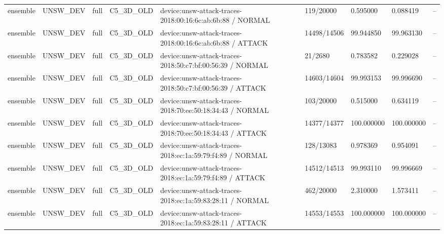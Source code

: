 \begin{tabular}{lllllllll}
ensemble & UNSW\_DEV & full & C5\_3D\_OLD & device:unsw-attack-traces-2018:00:16:6c:ab:6b:88 / NORMAL & 119/20000 & 0.595000 & 0.088419 & -- \\
ensemble & UNSW\_DEV & full & C5\_3D\_OLD & device:unsw-attack-traces-2018:00:16:6c:ab:6b:88 / ATTACK & 14498/14506 & 99.944850 & 99.963130 & -- \\
ensemble & UNSW\_DEV & full & C5\_3D\_OLD & device:unsw-attack-traces-2018:50:c7:bf:00:56:39 / NORMAL & 21/2680 & 0.783582 & 0.229028 & -- \\
ensemble & UNSW\_DEV & full & C5\_3D\_OLD & device:unsw-attack-traces-2018:50:c7:bf:00:56:39 / ATTACK & 14603/14604 & 99.993153 & 99.996690 & -- \\
ensemble & UNSW\_DEV & full & C5\_3D\_OLD & device:unsw-attack-traces-2018:70:ee:50:18:34:43 / NORMAL & 103/20000 & 0.515000 & 0.634119 & -- \\
ensemble & UNSW\_DEV & full & C5\_3D\_OLD & device:unsw-attack-traces-2018:70:ee:50:18:34:43 / ATTACK & 14377/14377 & 100.000000 & 100.000000 & -- \\
ensemble & UNSW\_DEV & full & C5\_3D\_OLD & device:unsw-attack-traces-2018:ec:1a:59:79:f4:89 / NORMAL & 128/13083 & 0.978369 & 0.954091 & -- \\
ensemble & UNSW\_DEV & full & C5\_3D\_OLD & device:unsw-attack-traces-2018:ec:1a:59:79:f4:89 / ATTACK & 14512/14513 & 99.993110 & 99.996669 & -- \\
ensemble & UNSW\_DEV & full & C5\_3D\_OLD & device:unsw-attack-traces-2018:ec:1a:59:83:28:11 / NORMAL & 462/20000 & 2.310000 & 1.573411 & -- \\
ensemble & UNSW\_DEV & full & C5\_3D\_OLD & device:unsw-attack-traces-2018:ec:1a:59:83:28:11 / ATTACK & 14553/14553 & 100.000000 & 100.000000 & -- \\
\hline
\end{tabular}
